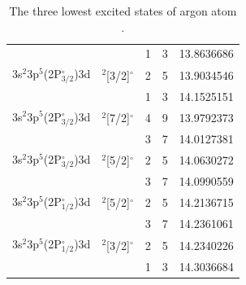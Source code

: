 \begin{table}[]
\begin{tabular}{lllll}
                 &             & 1 & 3 & 13.8636686                                             \\
3s$^\text{2}$3p$^\text{5}$(2P$^{\circ}_\text{3/2}$)3d & $^\text{2}${[}3/2{]}$^{\circ}$ & 2 & 5 & 13.9034546                                             \\
                 &             & 1 & 3 & 14.1525151                                             \\
3s$^\text{2}$3p$^\text{5}$(2P$^{\circ}_\text{3/2}$)3d & $^\text{2}${[}7/2{]}$^{\circ}$ & 4 & 9 & 13.9792373                                             \\
                 &             & 3 & 7 & 14.0127381                                             \\
3s$^\text{2}$3p$^\text{5}$(2P$^{\circ}_\text{3/2}$)3d & $^\text{2}${[}5/2{]}$^{\circ}$ & 2 & 5 & 14.0630272                                             \\
                 &             & 3 & 7 & 14.0990559                                             \\
3s$^\text{2}$3p$^\text{5}$(2P$^{\circ}_\text{1/2}$)3d & $^\text{2}${[}5/2{]}$^{\circ}$ & 2 & 5 & 14.2136715                                             \\
                 &             & 3 & 7 & 14.2361061                                             \\
3s$^\text{2}$3p$^\text{5}$(2P$^{\circ}_\text{1/2}$)3d & $^\text{2}${[}3/2{]}$^{\circ}$ & 2 & 5 & 14.2340226                                             \\
                 &             & 1 & 3 & 14.3036684                                             \\
\hline \hline
\end{tabular}
\caption{The three lowest excited states of argon atom \cite{kramida2020nist}.}
\label{table:argonStates}
\end{table}


